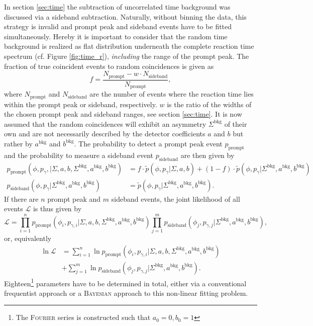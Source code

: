 In section \ref{sec:time} the subtraction of uncorrelated time background was discussed via a sideband subtraction. Naturally, without binning the data, this strategy is invalid and prompt peak and sideband events have to be fitted simultaneously. Hereby it is important to consider that the random time background is realized as flat distribution underneath the complete reaction time spectrum (cf. Figure \ref{fig:time_r}), \emph{including} the range of the prompt peak. The fraction of true coincident events to random coincidences is given as \begin{equation}
	f=\frac{N_\text{prompt}-w\cdot N_\text{sideband}}{N_\text{prompt}},
\end{equation}
where $N_\text{prompt}$ and $N_\text{sideband}$ are the number of events where the reaction time lies within the prompt peak or sideband, respectively. $w$ is the ratio of the widths of the chosen prompt peak and sideband
ranges, see section \ref{sec:time}. It is now assumed that the random coincidences will exhibit an asymmetry $\Sigma^\text{bkg}$ of their own and are not necessarily described by the detector coefficients $a$ and $b$ but rather by $a^\text{bkg}$ and $b^\text{bkg}$. The probability to detect a prompt peak event $p_\text{prompt}$ and the probability to measure a sideband event $p_\text{sideband}$ are then given by 
\begin{align}
p_\text{prompt}\left(\phi,p_\gamma,\big|\Sigma,a,b,\Sigma^\text{bkg},a^\text{bkg},b^\text{bkg}\right)&=f\cdot\tilde{p}\left(\phi,p_\gamma\big|\Sigma,a,b\right)+\left(1-f\right)\cdot\tilde{p}\left(\phi,p_\gamma\big|\Sigma^\text{bkg},a^\text{bkg},b^\text{bkg}\right)\label{eq:pprmpt}\\
p_\text{sideband}\left(\phi,p_\gamma\big|\Sigma^\text{bkg},a^\text{bkg},b^\text{bkg}\right)&=\tilde{p}\left(\phi,p_\gamma\big|\Sigma^\text{bkg},a^\text{bkg},b^\text{bkg}\right)\label{eq:pside}.
\end{align}
If there are $n$ prompt peak and $m$ sideband events, the joint likelihood of all events $\mathcal{L}$ is thus given by
\begin{equation}
	\mathcal{L}=\prod_{i=1}^{n}p_\text{prompt}\left(\phi_i,p_{\gamma,i}\big|\Sigma,a,b,\Sigma^\text{bkg},a^\text{bkg},b^\text{bkg}\right)\prod_{j=1}^mp_\text{sideband}\left(\phi_j,p_{\gamma,j}\big|\Sigma^\text{bkg},a^\text{bkg},b^\text{bkg}\right),
\end{equation}
or, equivalently
\begin{equation}
\begin{aligned}
	\ln\mathcal{L}&=\sum_{i=1}^{n}\ln p_\text{prompt}\left(\phi_i,p_{\gamma,i}\big|\Sigma,a,b,\Sigma^\text{bkg},a^\text{bkg},b^\text{bkg}\right)\\&+\sum_{j=1}^m \ln p_\text{sideband}\left(\phi_j,p_{\gamma,j}\big|\Sigma^\text{bkg},a^\text{bkg},b^\text{bkg}\right).\label{eq:lik}
\end{aligned}
\end{equation}
Eighteen\footnote{The \textsc{Fourier} series is constructed such that $a_0=0,b_0=1$} parameters have to be determined in total, either via a conventional frequentist approach or a \textsc{Bayesian} approach to this non-linear fitting problem.
